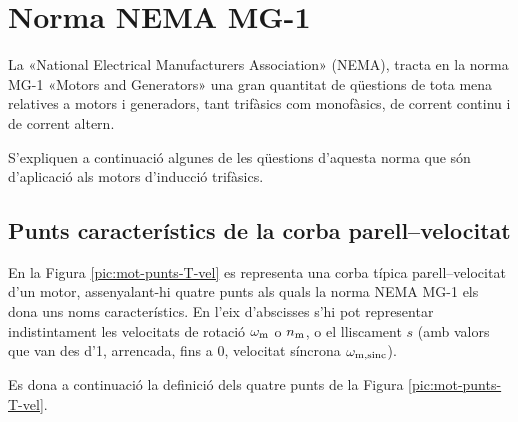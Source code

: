 \section{Norma NEMA MG-1}

La «National Electrical Manufacturers Association» (NEMA),
tracta en la norma  MG-1 «Motors and Generators» una gran quantitat de qüestions de tota mena relatives a motors i generadors, tant trifàsics com monofàsics, de corrent continu i de corrent altern.

S'expliquen a continuació algunes de les qüestions d'aquesta norma que són d'aplicació als motors d'inducció trifàsics.

\subsection{Punts característics de la corba parell--velocitat}

En la Figura \vref{pic:mot-punts-T-vel} es representa una corba típica parell--velocitat d'un motor, assenyalant-hi quatre punts als quals la norma NEMA MG-1 els dona uns noms característics. En l'eix d'abscisses s'hi pot representar indistintament les velocitats de rotació $\omega_\mathrm{m}$ o $n_\mathrm{m}$, o  el lliscament $s$ (amb valors que van des d'1, arrencada, fins a 0, velocitat síncrona $\omega_\mathrm{m,sinc}$).
\begin{center}
    
    \label{pic:mot-punts-T-vel}
\end{center}

Es dona a continuació la definició dels quatre punts de la Figura  \vref{pic:mot-punts-T-vel}.

